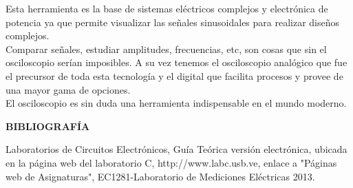 \documentclass[12pt]{article}
\begin{document}
\begin{enumerate}
		\noindent Esta herramienta es la base de sistemas eléctricos complejos y electrónica de potencia ya que permite visualizar las señales sinusoidales para realizar diseños complejos.\\
		
		\noindent Comparar señales, estudiar amplitudes, frecuencias, etc, son cosas que sin el osciloscopio serían imposibles. A su vez tenemos el osciloscopio analógico que fue el precursor de toda esta tecnología y el digital que facilita procesos y provee de una mayor gama de opciones.\\
		
		\noindent El osciloscopio es sin duda una herramienta indispensable en el mundo moderno.
		
	\end{enumerate}
	
	\newpage
	
	\begin{center}
		\textbf{\large BIBLIOGRAFÍA}\\
	\end{center}
	
	\noindent Laboratorios de Circuitos Electrónicos, Guía Teórica versión electrónica, ubicada en la página web del laboratorio C, http://www.labc.usb.ve, enlace a "Páginas web de Asignaturas", EC1281-Laboratorio de Mediciones Eléctricas 2013.
	
\end{document}
